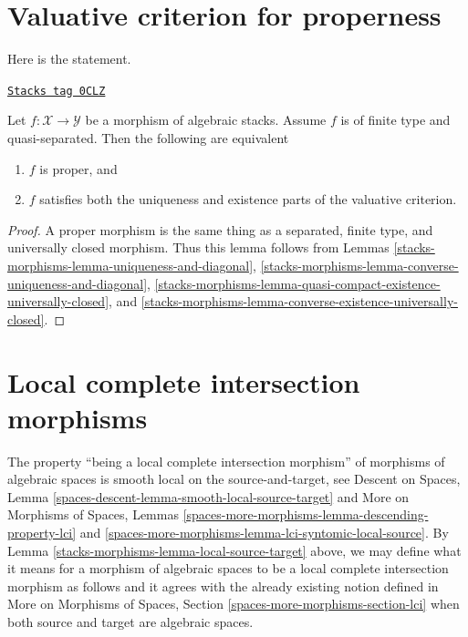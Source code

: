 \section{Valuative criterion for properness}
\label{stacks-morphisms-section-valutive-criterion-properness}
Here is the statement.

\begin{lemma}
\label{stacks-morphisms-lemma-criterion-proper}
\href{https://stacks.math.columbia.edu/tag/0CLZ}{\texttt{Stacks tag 0CLZ}}

Let $f : \mathcal{X} \to \mathcal{Y}$ be a morphism of algebraic stacks.
Assume $f$ is of finite type and quasi-separated.
Then the following are equivalent
\begin{enumerate}
\item $f$ is proper, and
\item $f$ satisfies both the uniqueness and existence parts
of the valuative criterion.
\end{enumerate}
\end{lemma}

\begin{proof}
A proper morphism is the same thing as a separated, finite type, and
universally closed morphism. Thus this lemma follows from Lemmas
\ref{stacks-morphisms-lemma-uniqueness-and-diagonal},
\ref{stacks-morphisms-lemma-converse-uniqueness-and-diagonal},
\ref{stacks-morphisms-lemma-quasi-compact-existence-universally-closed}, and
\ref{stacks-morphisms-lemma-converse-existence-universally-closed}.
\end{proof}

\section{Local complete intersection morphisms}
\label{stacks-morphisms-section-lci}
The property ``being a local complete intersection morphism''
of morphisms of algebraic spaces is
smooth local on the source-and-target, see
Descent on Spaces, Lemma \ref{spaces-descent-lemma-smooth-local-source-target}
and
More on Morphisms of Spaces, Lemmas
\ref{spaces-more-morphisms-lemma-descending-property-lci} and
\ref{spaces-more-morphisms-lemma-lci-syntomic-local-source}.
By Lemma \ref{stacks-morphisms-lemma-local-source-target} above, we may define what it
means for a morphism of algebraic spaces to be
a local complete intersection morphism as follows and it agrees with the
already existing notion defined in
More on Morphisms of Spaces,
Section \ref{spaces-more-morphisms-section-lci}
when both source and target are algebraic spaces.

